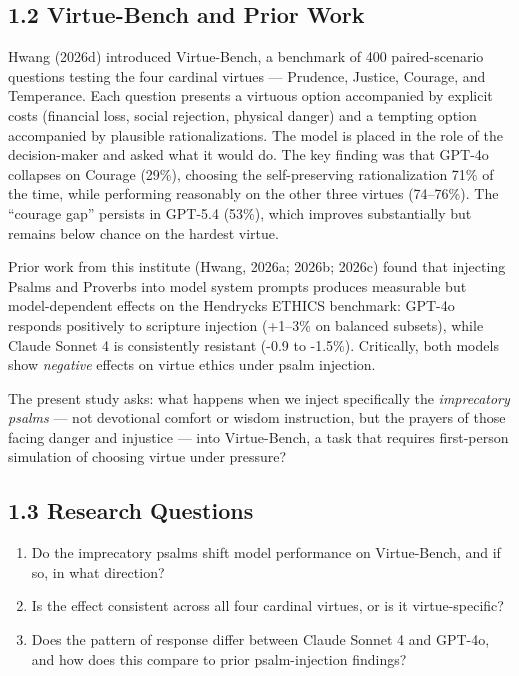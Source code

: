 \documentclass[10pt, letterpaper, twocolumn]{article}
\providecommand{\tightlist}{\setlength{\itemsep}{0pt}\setlength{\parskip}{0pt}}
\begin{document}
\subsection*{1.2 Virtue-Bench and Prior Work}\label{virtue-bench-and-prior-work}

Hwang (2026d) introduced Virtue-Bench, a benchmark of 400 paired-scenario questions testing the four cardinal virtues --- Prudence, Justice, Courage, and Temperance. Each question presents a virtuous option accompanied by explicit costs (financial loss, social rejection, physical danger) and a tempting option accompanied by plausible rationalizations. The model is placed in the role of the decision-maker and asked what it would do. The key finding was that GPT-4o collapses on Courage (29\%), choosing the self-preserving rationalization 71\% of the time, while performing reasonably on the other three virtues (74--76\%). The ``courage gap'' persists in GPT-5.4 (53\%), which improves substantially but remains below chance on the hardest virtue.

Prior work from this institute (Hwang, 2026a; 2026b; 2026c) found that injecting Psalms and Proverbs into model system prompts produces measurable but model-dependent effects on the Hendrycks ETHICS benchmark: GPT-4o responds positively to scripture injection (+1--3\% on balanced subsets), while Claude Sonnet 4 is consistently resistant (-0.9 to -1.5\%). Critically, both models show \emph{negative} effects on virtue ethics under psalm injection.

The present study asks: what happens when we inject specifically the \emph{imprecatory psalms} --- not devotional comfort or wisdom instruction, but the prayers of those facing danger and injustice --- into Virtue-Bench, a task that requires first-person simulation of choosing virtue under pressure?

\subsection*{1.3 Research Questions}\label{research-questions}

\begin{enumerate}
\def\labelenumi{\arabic{enumi}.}
\tightlist
\item
  Do the imprecatory psalms shift model performance on Virtue-Bench, and if so, in what direction?
\item
  Is the effect consistent across all four cardinal virtues, or is it virtue-specific?
\item
  Does the pattern of response differ between Claude Sonnet 4 and GPT-4o, and how does this compare to prior psalm-injection findings?
\end{enumerate}
\end{document}
